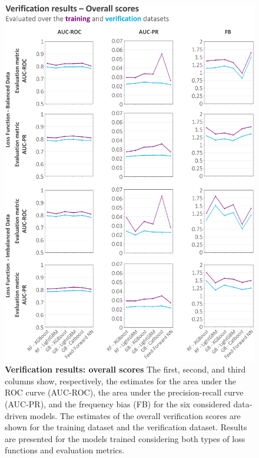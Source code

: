 \begin{figure}[htbp]
\centering
\includegraphics[width=\textwidth]{verif_training_test_overall.png}
\caption{\textbf{Verification results: overall scores} The first, second, and third columns show, respectively, the estimates for the area under the ROC curve (AUC-ROC), the area under the precision-recall curve (AUC-PR), and the frequency bias (FB) for the six considered data-driven models. The estimates of the overall verification scores are shown for the \textcolor{colourTraining}{training dataset} and the \textcolor{colourTest}{verification dataset}. Results are presented for the models trained considering both types of loss functions and evaluation metrics.}
\label{fig:verif_training_test_overall}
\end{figure}


